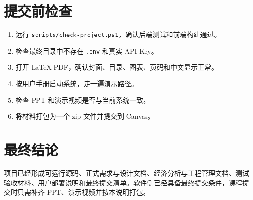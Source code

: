 \documentclass[12pt,a4paper]{ctexart}
\newcommand{\code}[1]{{\footnotesize\nolinkurl{#1}}}
\begin{document}
\section{提交前检查}
\begin{enumerate}
    \item 运行 \code{scripts/check-project.ps1}，确认后端测试和前端构建通过。
    \item 检查最终目录中不存在 \code{.env} 和真实 API Key。
    \item 打开 LaTeX PDF，确认封面、目录、图表、页码和中文显示正常。
    \item 按用户手册启动系统，走一遍演示路径。
    \item 检查 PPT 和演示视频是否与当前系统一致。
    \item 将材料打包为一个 zip 文件并提交到 Canvas。
\end{enumerate}

\section{最终结论}
项目已经形成可运行源码、正式需求与设计文档、经济分析与工程管理文档、测试验收材料、用户部署说明和最终提交清单。软件侧已经具备最终提交条件，课程提交时只需补齐 PPT、演示视频并按本说明打包。
\end{document}
